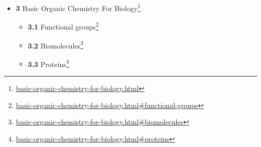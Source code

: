 \documentclass[
]{article}
\providecommand{\tightlist}{%
  \setlength{\itemsep}{0pt}\setlength{\parskip}{0pt}}
\providecommand{\tightlist}{%
  \setlength{\itemsep}{0pt}\setlength{\parskip}{0pt}}
\let\rmarkdownfootnote\footnote%
\def\footnote{\protect\rmarkdownfootnote}
\renewcommand{\href}[2]{#2\footnote{\url{#1}}}
\theoremstyle{definition}
\theoremstyle{definition}
\theoremstyle{definition}
\theoremstyle{remark}
\begin{document}
\begin{itemize}
\begin{itemize}
    \begin{itemize}
    \tightlist
    \item
      \href{basic-general-chemistry-for-biology.html\#structure-of-the-atom}{\emph{}\textbf{2.2.1}
      Structure of The Atom}
    \item
      \href{basic-general-chemistry-for-biology.html\#the-atomic-nucleus}{\emph{}\textbf{2.2.2}
      The Atomic Nucleus}
    \item
      \href{basic-general-chemistry-for-biology.html\#the-electron-cloud}{\emph{}\textbf{2.2.3}
      The Electron Cloud}
    \end{itemize}
  \item
    \href{basic-general-chemistry-for-biology.html\#the-periodic-table-of-the-elements}{\emph{}\textbf{2.3}
    The Periodic Table of The Elements}
  \item
    \href{basic-general-chemistry-for-biology.html\#chemical-bonds-molecules-and-compounds}{\emph{}\textbf{2.4}
    Chemical Bonds, Molecules, And Compounds}
  \item
    \href{basic-general-chemistry-for-biology.html\#energy-1}{\emph{}\textbf{2.5}
    Energy}
  \item
    \href{basic-general-chemistry-for-biology.html\#chemical-reactions}{\emph{}\textbf{2.6}
    Chemical Reactions}
  \item
    \href{basic-general-chemistry-for-biology.html\#radioactive-decay-of-atoms}{\emph{}\textbf{2.7}
    Radioactive Decay of Atoms}
  \item
    \href{basic-general-chemistry-for-biology.html\#ions-and-salts}{\emph{}\textbf{2.8}
    Ions And Salts}
  \item
    \href{basic-general-chemistry-for-biology.html\#acids-and-bases}{\emph{}\textbf{2.9}
    Acids And Bases}
  \item
    \href{basic-general-chemistry-for-biology.html\#redox}{\emph{}\textbf{2.10}
    Redox}
  \item
    \href{basic-general-chemistry-for-biology.html\#water}{\emph{}\textbf{2.11}
    Water}
  \end{itemize}
\item
  \href{basic-organic-chemistry-for-biology.html}{\emph{}\textbf{3}
  Basic Organic Chemistry For Biology}

  \begin{itemize}
  \tightlist
  \item
    \href{basic-organic-chemistry-for-biology.html\#functional-groups}{\emph{}\textbf{3.1}
    Functional groups}
  \item
    \href{basic-organic-chemistry-for-biology.html\#biomolecules}{\emph{}\textbf{3.2}
    Biomolecules}
  \item
    \href{basic-organic-chemistry-for-biology.html\#proteins}{\emph{}\textbf{3.3}
    Proteins}


\end{itemize}
\end{itemize}
\end{document}
